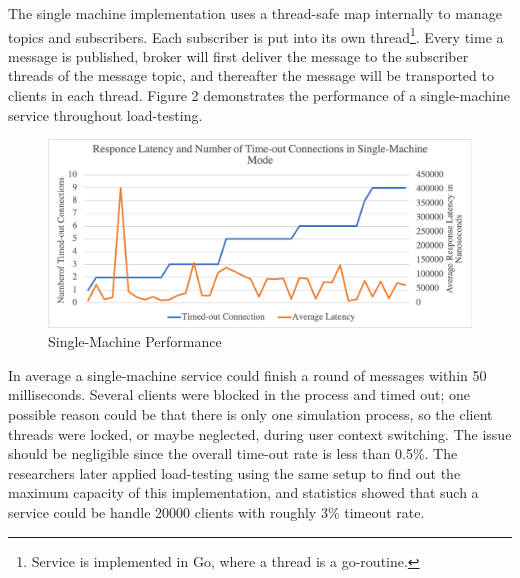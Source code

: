 The single machine implementation uses a thread-safe map internally to manage topics and subscribers. Each subscriber is put into its own thread\footnote{Service is implemented in Go\citep{golang}, where a thread is a go-routine.}. Every time a message is published, broker will first deliver the message to the subscriber threads of the message topic, and thereafter the message will be transported to clients in each thread. Figure 2 demonstrates the performance of a single-machine service throughout load-testing.

\begin{figure}[H]
	\centering
	\includegraphics[scale=0.33]{figure/single_machine/performance.png}
	\caption{Single-Machine Performance}
\end{figure}

In average a single-machine service could finish a round of messages within 50 milliseconds. Several clients were blocked in the process and timed out; one possible reason could be that there is only one simulation process, so the client threads were locked, or maybe neglected, during user context switching. The issue should be negligible since the overall time-out rate is less than 0.5\%. The researchers later applied load-testing using the same setup to find out the maximum capacity of this implementation, and statistics showed that such a service could be handle 20000 clients with roughly 3\% timeout rate.
